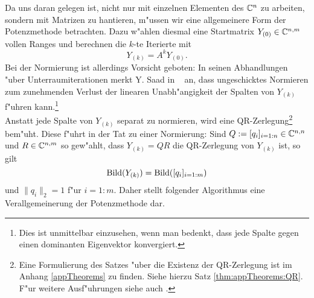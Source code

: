 
\newpage
Da uns daran gelegen ist, nicht nur mit einzelnen Elementen des $\mathbb{C}^n$ zu arbeiten, sondern mit Matrizen zu hantieren, m"ussen wir eine allgemeinere Form der Potenzmethode betrachten. Dazu w"ahlen diesmal eine Startmatrix $Y_{(0)}\in\mathbb{C}^{n,m}$ vollen Ranges und berechnen die $k$-te Iterierte mit
\[
Y_{(k)} = A^k Y_{(0)}.
\]
Bei der Normierung ist allerdings Vorsicht geboten: In seinen Abhandlungen "uber Unterraumiterationen
merkt Y. Saad in ~\cite[Abschnitt 5.1]{saad} an,
dass ungeschicktes Normieren zum zunehmenden Verlust der linearen Unabh"angigkeit der Spalten von $Y_{(k)}$ f"uhren kann.\footnote{Dies ist unmittelbar einzusehen, wenn man bedenkt, dass jede Spalte gegen einen dominanten Eigenvektor konvergiert.}\\

Anstatt jede Spalte von $Y_{(k)}$ separat zu normieren, wird eine QR-Zerlegung\footnote{Eine Formulierung des Satzes "uber die Existenz der QR-Zerlegung ist im Anhang \ref{appTheorems} zu finden. Siehe hierzu Satz \ref{thm:appTheorems:QR}. F"ur weitere Ausf"uhrungen siehe auch \cite[S. 55 ff.]{stewart}.}
bem"uht. Diese f"uhrt in der Tat zu einer Normierung: Sind $Q := [q_i]_{i=1:n}\in\mathbb{C}^{n,n}$ und $R\in\mathbb{C}^{n,m}$ so gew"ahlt, dass $Y_{(k)} = QR$ die QR-Zerlegung von $Y_{(k)}$ ist, so gilt
\[
\operatorname{Bild}(Y_{(k)}) = \operatorname{Bild}([q_i]_{i=1:m})
\]
und $\|q_i\|_2 = 1$ f"ur $i=1:m$. Daher stellt folgender Algorithmus eine Verallgemeinerung der Potenzmethode dar.

